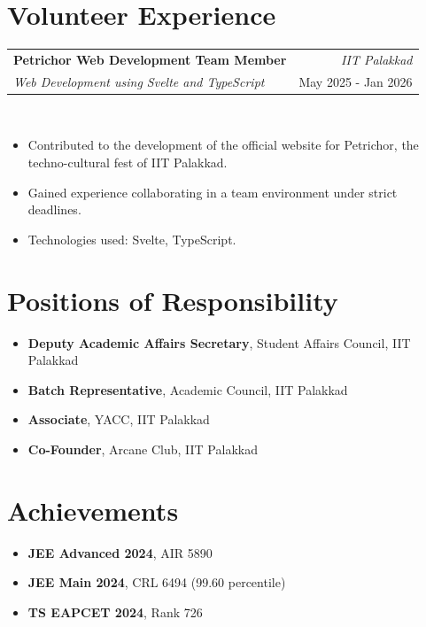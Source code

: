 \documentclass[a4paper,10pt]{article}
\makeatletter
\newcommand{\resumeSubheading}[4]{
\vspace{1.2mm}
    \begin{tabular*}{1.0\textwidth}[t]{l@{\extracolsep{\fill}}r}
        \textbf{#1} & \textit{\small{#4}} \\
        \textit{\small{#3}} &  \small{#2}\\
    \end{tabular*}\\[-1.5mm]
}
\newcommand{\resumeSubHeadingListStart}{}
\newcommand{\resumeItemListStart}{\vspace{-1mm}\begin{justify}\begin{itemize}[leftmargin=3ex, rightmargin=2ex, noitemsep,labelsep=1.2mm,itemsep=0.4mm]\small}
\newcommand{\resumeSubHeadingListEnd}{\vspace{0.5mm}}
\newcommand{\resumeItemListEnd}{\end{itemize}\end{justify}\vspace{-1.2mm}}
\makeatother
\begin{document}
\section{\textbf{Volunteer Experience}}

\resumeSubHeadingListStart

\resumeSubheading
    {Petrichor Web Development Team Member}
    {May 2025 - Jan 2026}
    {Web Development using Svelte and TypeScript}
    {IIT Palakkad}

\resumeItemListStart
  \item Contributed to the development of the official website for Petrichor, the techno-cultural fest of IIT Palakkad.
  \item Gained experience collaborating in a team environment under strict deadlines.
  \item Technologies used: Svelte, TypeScript.
\resumeItemListEnd
\resumeSubHeadingListEnd

\section{\textbf{Positions of Responsibility}}
\begin{itemize}[leftmargin=3ex, noitemsep, itemsep=0.6mm]
  \item \textbf{Deputy Academic Affairs Secretary}, Student Affairs Council, IIT Palakkad
  \item \textbf{Batch Representative}, Academic Council, IIT Palakkad
  \item \textbf{Associate}, YACC, IIT Palakkad
  \item \textbf{Co-Founder}, Arcane Club, IIT Palakkad
\end{itemize}

\section{\textbf{Achievements}}
\begin{itemize}[leftmargin=3ex, noitemsep, itemsep=0.6mm]
  \item \textbf{JEE Advanced 2024}, AIR 5890
  \item \textbf{JEE Main 2024}, CRL 6494 (99.60 percentile)
  \item \textbf{TS EAPCET 2024}, Rank 726
\end{itemize}

\end{document}
